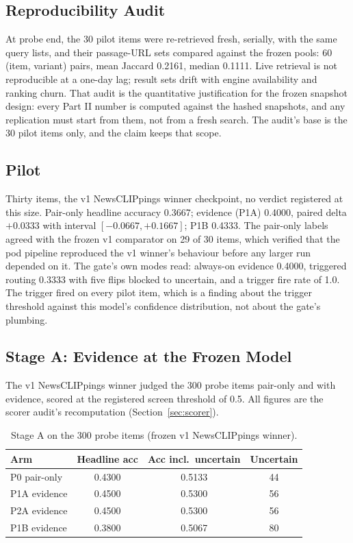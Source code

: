\documentclass{article} %
\begin{document}
\subsection{Reproducibility Audit}
At probe end, the 30 pilot items were re-retrieved fresh, serially, with the same query lists, and their passage-URL sets compared against the frozen pools: 60 (item, variant) pairs, mean Jaccard 0.2161, median 0.1111. Live retrieval is not reproducible at a one-day lag; result sets drift with engine availability and ranking churn. That audit is the quantitative justification for the frozen snapshot design: every Part II number is computed against the hashed snapshots, and any replication must start from them, not from a fresh search. The audit's base is the 30 pilot items only, and the claim keeps that scope.

\subsection{Pilot}
Thirty items, the v1 NewsCLIPpings winner checkpoint, no verdict registered at this size. Pair-only headline accuracy 0.3667; evidence (P1A) 0.4000, paired delta \(+0.0333\) with interval \([-0.0667, +0.1667]\); P1B 0.4333. The pair-only labels agreed with the frozen v1 comparator on 29 of 30 items, which verified that the pod pipeline reproduced the v1 winner's behaviour before any larger run depended on it. The gate's own modes read: always-on evidence 0.4000, triggered routing 0.3333 with five flips blocked to uncertain, and a trigger fire rate of 1.0. The trigger fired on every pilot item, which is a finding about the trigger threshold against this model's confidence distribution, not about the gate's plumbing.

\subsection{Stage A: Evidence at the Frozen Model}
The v1 NewsCLIPpings winner judged the 300 probe items pair-only and with evidence, scored at the registered screen threshold of 0.5. All figures are the scorer audit's recomputation (Section~\ref{sec:scorer}).

\begin{table}[t]
\centering
\small
\caption{Stage A on the 300 probe items (frozen v1 NewsCLIPpings winner).}
\label{tab:stagea}
\begin{tabular}{lccc}
\toprule
Arm & Headline acc & Acc incl.\ uncertain & Uncertain \\
\midrule
P0 pair-only & 0.4300 & 0.5133 & 44 \\
P1A evidence & 0.4500 & 0.5300 & 56 \\
P2A evidence & 0.4500 & 0.5300 & 56 \\
P1B evidence & 0.3800 & 0.5067 & 80 \\
\bottomrule
\end{tabular}
\end{table}
\end{document}
